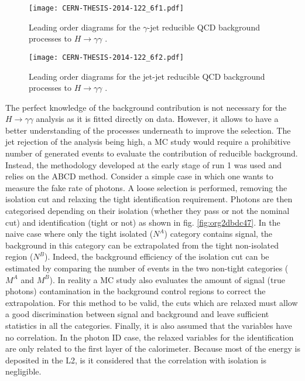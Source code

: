 \begin{figure}[htbp]
\centering
\texttt{[image: CERN-THESIS-2014-122\_6f1.pdf]}
\caption{\label{fig:org14dadc0}
Leading order diagrams for the \(\gamma\)-jet reducible QCD background processes to $H\rightarrow\gamma\gamma$ \cite{CERN-THESIS-2014-122}.}
\end{figure}

\begin{figure}[htbp]
\centering
\texttt{[image: CERN-THESIS-2014-122\_6f2.pdf]}
\caption{\label{fig:orgde7979b}
Leading order diagrams for the jet-jet reducible QCD background processes to $H\rightarrow\gamma\gamma$ \cite{CERN-THESIS-2014-122}.}
\end{figure}

The perfect knowledge of the background contribution is not necessary for the $H\rightarrow\gamma\gamma$ analysis as it is fitted directly on data.
However, it allows to have a better understanding of the processes underneath to improve the selection.
The jet rejection of the analysis being high, a MC study would require a prohibitive number of generated events to evaluate the contribution of reducible background.
Instead, the methodology developed  at the early stage of run 1\cite{ATL-COM-PHYS-2011-782,PhysRevD.85.012003,CERN-PH-EP-2012-300,CERN-THESIS-2011-157} was used and relies on the ABCD method.
Consider a simple case in which one wants to measure the fake rate of photons.
A loose selection is performed, removing the isolation cut and relaxing the tight identification requirement.
Photons are then categorised depending on their isolation (whether they pass or not the nominal cut) and identification (tight or not) as shown in fig. \ref{fig:org2dbdc47}.
In the naive case where only the tight isolated ($N^A$) category contains signal, the background in this category can be extrapolated from the tight non-isolated region ($N^B$).
Indeed, the background efficiency of the isolation cut can be estimated by comparing the number of events in the two non-tight categories ($M^A$ and $M^B$).
In reality a MC study also evaluates the amount of signal (true photons) contamination in the background control regions to correct the extrapolation.
For this method to be valid, the cuts which are relaxed must allow a good discrimination between signal and background and leave sufficient statistics in all the categories.
Finally, it is also assumed that the variables have no correlation.
In the photon ID case, the relaxed variables for the identification are only related to the first layer of the calorimeter.
Because most of the energy is deposited in the L2, is it considered that the correlation with isolation is negligible.

